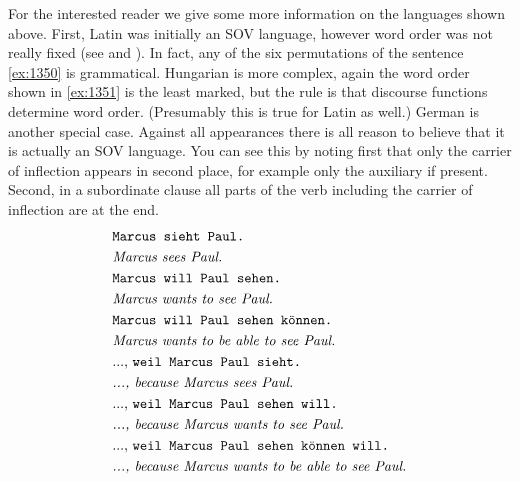 For the interested reader we give some more information on the
languages shown above. First, Latin 
was initially an SOV language,
however word order was not really fixed (see
\cite{lehmann:bases} and \cite{bauer:latin}). In fact, any of the six
permutations of the sentence \eqref{ex:1350} is grammatical.
Hungarian is more complex, again the word order shown in
\eqref{ex:1351} is the least marked, but the rule is that
discourse functions determine word order. (Presumably this is true 
for Latin as well.) German 
is another special case. Against all appearances there is all reason to
believe that it is actually an SOV language. You can see this by
noting first that only the carrier of inflection appears in second
place, for example only the auxiliary if present. Second, in a
subordinate clause all parts of the verb including the carrier of
inflection are at the end.
\begin{align}
& \mbox{\tt Marcus sieht Paul.} \\\notag
& \mbox{\it Marcus sees Paul.} \\
& \mbox{\tt Marcus will Paul sehen.} \\\notag
& \mbox{\it Marcus wants to see Paul.} \\
& \mbox{\tt Marcus will Paul sehen k\"onnen.} \\\notag
& \mbox{\it Marcus wants to be able to see Paul.} \\
& \mbox{..., {\tt weil Marcus Paul sieht.}} \\\notag
& \mbox{\it ..., because Marcus sees Paul.} \\
& \mbox{..., {\tt weil Marcus Paul sehen will.}} \\\notag
& \mbox{\it ..., because Marcus wants to see Paul.} \\
& \mbox{..., {\tt weil Marcus Paul sehen k\"onnen will.}} \\\notag
& \mbox{\it ..., because Marcus wants to be able to see Paul.}
\end{align}
